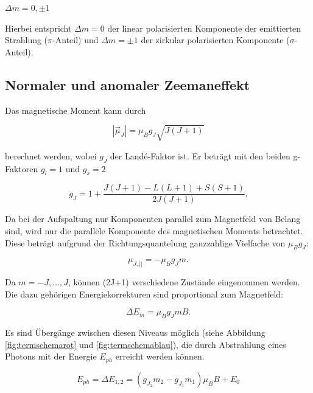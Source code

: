 \begin{center}
	$\Delta m = 0 ,\pm 1$
\end{center}

Hierbei entspricht $\Delta m = 0$ der linear polarisierten Komponente der emittierten Strahlung ($\pi$-Anteil) und $\Delta m = \pm 1$
der zirkular polarisierten Komponente ($\sigma$-Anteil).

\subsection{Normaler und anomaler Zeemaneffekt}

Das magnetische Moment kann durch

\begin{equation}
	|\vec{\mu}_J| = \mu_B g_J \sqrt{J(J+1)}
\end{equation}

berechnet werden, wobei $g_J$ der Landé-Faktor ist. Er beträgt mit den beiden g-Faktoren $g_l=1$ und $g_s=2$

\begin{equation}
	g_J = 1 + \frac{J(J+1) - L(L+1) + S(S+1)}{2J(J+1)} .
\end{equation}

Da bei der Aufspaltung nur Komponenten parallel zum Magnetfeld von Belang sind, wird nur die parallele Komponente des
magnetischen Moments betrachtet. Diese beträgt aufgrund der Richtungsquantelung ganzzahlige Vielfache von $\mu_B g_J$:

\begin{equation}
 \mu_{J,||} = -\mu_B g_J m .
\end{equation}

Da $m = -J, ..., J$, können (2J+1) verschiedene Zustände eingenommen werden. Die dazu gehörigen Energiekorrekturen
sind proportional zum Magnetfeld:

\begin{equation}
 \Delta E_m = \mu_B g_J m B .
 \label{eqn:delta_E}
\end{equation}

Es sind Übergänge zwischen diesen Niveaus möglich (siehe Abbildung \ref{fig:termschemarot} und \ref{fig:termschemablau}), die durch Abstrahlung eines Photons mit der Energie $E_{ph}$
erreicht werden können.

\begin{equation}
	E_{ph} = \Delta E_{1,2} = (g_{J_2} m_2 - g_{J_1} m_1) \mu_B B + E_0
\end{equation}

